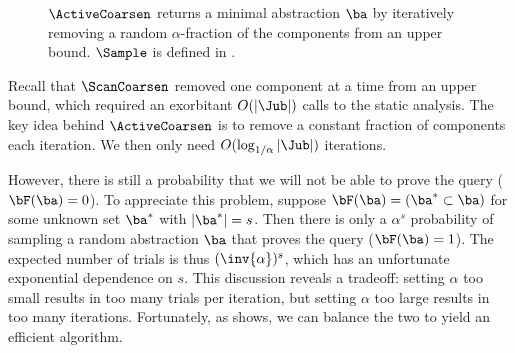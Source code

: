 \begin{figure}[t]
\begin{center}  \end{center} %
\caption{\label{fig:activeCoarsen}
$\ActiveCoarsen$ returns a minimal abstraction $\ba$ by iteratively removing a random
$\alpha$-fraction of the components from an upper bound.
$\Sample$ is defined in .
}
\end{figure}

Recall that $\ScanCoarsen$ removed one component at a time from an upper bound,
which required an exorbitant $O(|\Jub|)$ calls to the static analysis.
The key idea behind $\ActiveCoarsen$ is to remove a constant fraction of
components each iteration.  We then only need $O(\log_{1/\alpha} |\Jub|)$ iterations.

However, there is still a probability that we will not be able to prove the
query ($\bF(\ba) = 0$).  To appreciate this problem, suppose
$\bF(\ba) = (\ba^* \subset \ba)$ for some unknown set $\ba^*$ with $|\ba^*| = s$.
Then there is only a $\alpha^s$ probability of sampling a random abstraction
$\ba$ that proves the query ($\bF(\ba) = 1$).
The expected number of trials is thus $(\inv{\alpha})^s$, which has an
unfortunate exponential dependence on $s$.
This discussion reveals a tradeoff: setting $\alpha$ too small results in too many trials per iteration,
but setting $\alpha$ too large results in too many iterations.
Fortunately, as  shows, we can balance the two
to yield an efficient algorithm.

